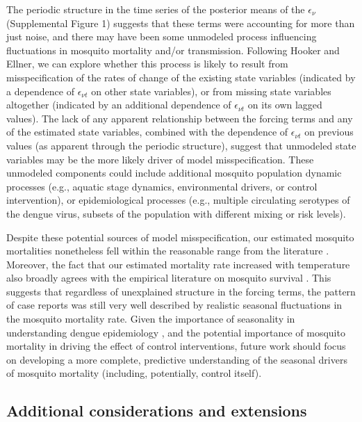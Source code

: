 \documentclass[10pt,letterpaper]{article}
\begin{document}
The periodic structure in the time series of the posterior means of the $\epsilon_{\nu}$ (Supplemental Figure 1) suggests that these terms were accounting for more than just noise, and there may have been some unmodeled process influencing fluctuations in mosquito mortality and/or transmission.
Following Hooker and Ellner, we can explore whether this process is likely to result from misspecification of the rates of change of the existing state variables (indicated by a dependence of $\epsilon_{\nu t}$ on other state variables), or from missing state variables altogether (indicated by an additional dependence of $\epsilon_{\nu t}$ on its own lagged values). 
The lack of any apparent relationship between the forcing terms and any of the estimated state variables, combined with the dependence of $\epsilon_{\nu t}$ on previous values (as apparent through the periodic structure), suggest that unmodeled state variables may be the more likely driver of model misspecification.
These unmodeled components could include additional mosquito population dynamic processes (e.g., aquatic stage dynamics, environmental drivers, or control intervention), or epidemiological processes (e.g., multiple circulating serotypes of the dengue virus, subsets of the population with different mixing or risk levels).

Despite these potential sources of model misspecification, our estimated mosquito mortalities nonetheless fell within the reasonable range from the literature \cite{Maciel-de-Freitas2008, Brady2013}.
Moreover, the fact that our estimated mortality rate increased with temperature also broadly agrees with the empirical literature on mosquito survival \cite{Yang2009, Brady2013, Morin2013}.
This suggests that regardless of unexplained structure in the forcing terms, the pattern of case reports was still very well described by realistic seasonal fluctuations in the mosquito mortality rate.
Given the importance of seasonality in understanding dengue epidemiology \cite{TenBosch2016}, and the potential importance of mosquito mortality in driving the effect of control interventions, future work should focus on developing a more complete, predictive understanding of the seasonal drivers of mosquito mortality (including, potentially, control itself).

\subsection*{Additional considerations and extensions}
\end{document}
